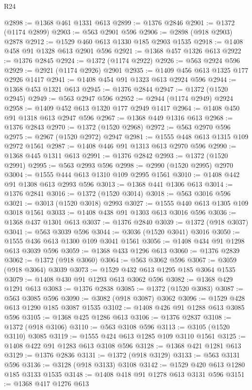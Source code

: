 \begin{lexlean}{R24}
\begin{coremodule}
@2898 := @1368 @461 @1331 @613
@2899 := @1376 @2846
@2901 := @1372 (@1174 @2899)
@2903 := @563 @2901 @596
@2906 := @2898 (@918 @2903) @2878
@2912 := @1529 @460 @613 @1330 @185 @2903 @1535
@2918 := @1408 @458 @91 @1328 @613 @2901 @596
@2921 := @1368 @457 @1326 @613
@2922 := @1376 @2845
@2924 := @1372 (@1174 @2922)
@2926 := @563 @2924 @596
@2929 := @2921 (@1174 @2926) @2901
@2935 := @1409 @456 @613 @1325 @177 @2926 @1417
@2941 := @1408 @454 @91 @1323 @613 @2924 @596
@2944 := @1368 @453 @1321 @613
@2945 := @1376 @2844
@2947 := @1372 (@1520 @2945)
@2949 := @563 @2947 @596
@2952 := @2944 (@1174 @2949) @2924
@2958 := @1409 @452 @613 @1320 @177 @2949 @1417
@2964 := @1408 @450 @91 @1318 @613 @2947 @596
@2967 := @1368 @449 @1316 @613
@2968 := @1376 @2843
@2970 := @1372 (@1520 @2968)
@2972 := @563 @2970 @596
@2975 := @2967 (@1520 @2972) @2947
@2981 := @1555 @448 @613 @1315 @109 @2972 @1561
@2987 := @1408 @446 @91 @1313 @613 @2970 @596
@2990 := @1368 @445 @1311 @613
@2991 := @1376 @2842
@2993 := @1372 (@1520 @2991)
@2995 := @563 @2993 @596
@2998 := @2990 (@1520 @2995) @2970
@3004 := @1555 @444 @613 @1310 @109 @2995 @1561
@3010 := @1408 @442 @91 @1308 @613 @2993 @596
@3013 := @1368 @441 @1306 @613
@3014 := @1376 @2841
@3016 := @1372 (@1520 @3014)
@3018 := @563 @3016 @596
@3021 := @3013 (@1520 @3018) @2993
@3027 := @1555 @440 @613 @1305 @109 @3018 @1561
@3033 := @1408 @438 @91 @1303 @613 @3016 @596
@3036 := @1368 @437 @1301 @613
@3037 := @1376 @2840
@3039 := @1372 (@918 @3037)
@3041 := @563 @3039 @596
@3044 := @3036 (@1520 @3041) @3016
@3050 := @1555 @436 @613 @1300 @109 @3041 @1561
@3056 := @1408 @434 @91 @1298 @613 @3039 @596
@3059 := @1368 @433 @1296 @613
@3060 := @1376 @2839
@3062 := @1372 (@918 @3060)
@3064 := @563 @3062 @596
@3067 := @3059 (@918 @3064) @3039
@3073 := @1529 @432 @613 @1295 @185 @3064 @1535
@3079 := @1408 @430 @91 @1293 @613 @3062 @596
@3082 := @1368 @429 @1291 @613
@3083 := @1376 @2838
@3085 := @1372 (@1520 @3083)
@3087 := @563 @3085 @596
@3090 := @3082 (@918 @3087) @3062
@3096 := @1529 @428 @613 @1290 @185 @3087 @1535
@3102 := @1408 @426 @91 @1288 @613 @3085 @596
@3105 := @1368 @425 @1286 @613
@3106 := @1376 @2837
@3108 := @1372 (@918 @3106)
@3110 := @563 @3108 @596
@3113 := @3105 (@1520 @3110) @3085
@3119 := @1555 @424 @613 @1285 @109 @3110 @1561
@3125 := @1408 @422 @91 @1283 @613 @3108 @596
@3128 := @1368 @421 @1281 @613
@3129 := @1376 @2836
@3131 := @1372 (@918 @3129)
@3133 := @563 @3131 @596
@3136 := @3128 (@918 @3133) @3108
@3142 := @1529 @420 @613 @1280 @185 @3133 @1535
@3148 := @1408 @418 @91 @1278 @613 @3131 @596
@3151 := @1368 @417 @1276 @613

\end{coremodule}
\end{lexlean}

